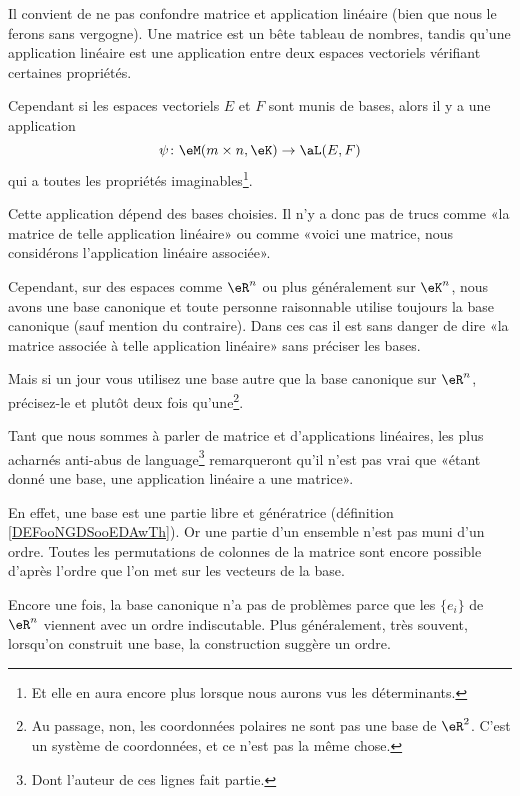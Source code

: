 \begin{normaltext}
    Il convient de ne pas confondre matrice et application linéaire (bien que nous le ferons sans vergogne). Une matrice est un bête tableau de nombres, tandis qu'une application linéaire est une application entre deux espaces vectoriels vérifiant certaines propriétés.

    Cependant si les espaces vectoriels \( E\) et \( F\) sont munis de bases, alors il y a une application
    \begin{equation}
        \psi\colon \eM(m\times n,\eK)\to \aL(E,F)
    \end{equation}
    qui a toutes les propriétés imaginables\footnote{Et elle en aura encore plus lorsque nous aurons vus les déterminants.}.

    Cette application dépend des bases choisies. Il n'y a donc pas de trucs comme «la matrice de telle application linéaire» ou comme «voici une matrice, nous considérons l'application linéaire associée». 

    Cependant, sur des espaces comme \( \eR^n\) ou plus généralement sur \( \eK^n\), nous avons une base canonique et toute personne raisonnable utilise toujours la base canonique (sauf mention du contraire). Dans ces cas il est sans danger de dire «la matrice associée à telle application linéaire» sans préciser les bases.

    Mais si un jour vous utilisez une base autre que la base canonique sur \( \eR^n\), précisez-le et plutôt deux fois qu'une\footnote{Au passage, non, les coordonnées polaires ne sont pas une base de \( \eR^2\). C'est un système de coordonnées, et ce n'est pas la même chose.}.
\end{normaltext}

\begin{normaltext}
    Tant que nous sommes à parler de matrice et d'applications linéaires, les plus acharnés anti-abus de language\footnote{Dont l'auteur de ces lignes fait partie.} remarqueront qu'il n'est pas vrai que «étant donné une base, une application linéaire a une matrice».

    En effet, une base est une partie libre et génératrice (définition \ref{DEFooNGDSooEDAwTh}). Or une partie d'un ensemble n'est pas muni d'un ordre. Toutes les permutations de colonnes de la matrice sont encore possible d'après l'ordre que l'on met sur les vecteurs de la base.

    Encore une fois, la base canonique n'a pas de problèmes parce que les \( \{ e_i \}\) de \( \eR^n\) viennent avec un ordre indiscutable. Plus généralement, très souvent, lorsqu'on construit une base, la construction suggère un ordre.
\end{normaltext}


